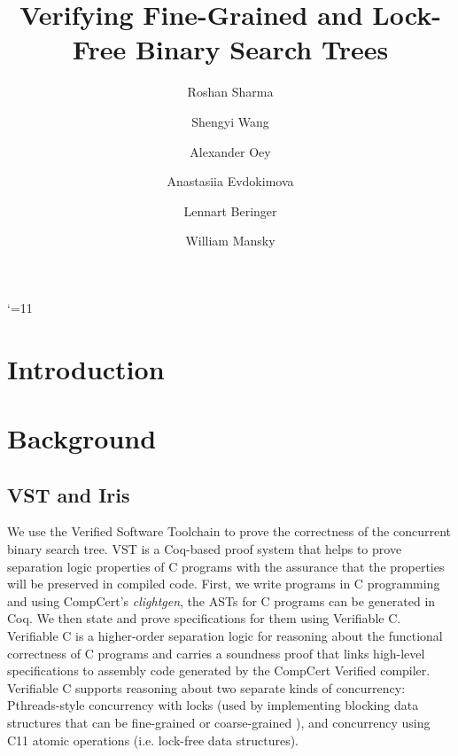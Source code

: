 \documentclass[acmsmall,screen]{acmart}\settopmatter{printfolios=true}
\title{Verifying Fine-Grained and Lock-Free Binary Search Trees}
\author{Roshan Sharma}
\author{Shengyi Wang}
\author{Alexander Oey}
\author{Anastasiia Evdokimova}
\author{Lennart Beringer}
\author{William Mansky}
\date{} %
\begin{document}
\maketitle

\catcode`\@=11
\section{Introduction}


\section{Background}
\label{background}
\subsection{VST and Iris}
We use the Verified Software Toolchain \cite{plfcc}  to prove the correctness of the concurrent binary search tree. VST is a Coq-based proof system that helps to prove separation logic properties of C programs with the assurance that the properties will be preserved in compiled code. First, we write programs in C programming and using CompCert’s \emph{clightgen}, the ASTs for C programs can be generated in Coq. We then state and prove specifications for them using Verifiable C. Verifiable C is a higher-order separation logic for reasoning about the functional correctness of C programs and carries a soundness proof that links high-level specifications to assembly code generated by the CompCert Verified compiler. Verifiable C supports reasoning about two separate kinds of concurrency:  Pthreads-style concurrency with locks (used by implementing blocking data structures that can be fine-grained or coarse-grained ), and concurrency using C11 atomic operations (i.e. lock-free data structures). 
\end{document}
